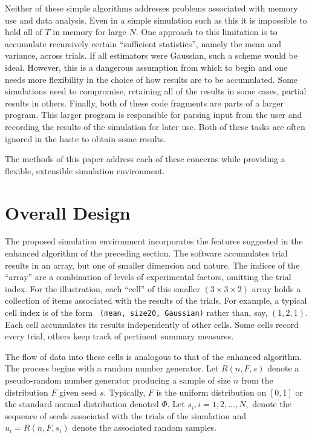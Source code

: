 Neither of these simple algorithms addresses problems associated with
memory use and data analysis.  Even in a simple simulation such as
this it is impossible to hold all of $T$ in memory for large $N$. One
approach to this limitation is to accumulate recursively certain
``sufficient statistics'', namely the mean and variance, across
trials. If all estimators were Gaussian, such a scheme would be
ideal.  However, this is a dangerous assumption from which to begin
and one needs more flexibility in the choice of how results are to be
accumulated. Some simulations need to compromise, retaining
all of the results in some cases, partial results in others. 
Finally, both of these code fragments are parts of a larger
program.  This larger program is responsible for parsing
input from the user and recording the results of the simulation
for later use.  Both of these tasks are often ignored in the haste to
obtain some results.

The methods of this paper address each of these concerns while
providing a flexible, extensible simulation environment.


\section{Overall Design}

The proposed simulation environment incorporates the features
suggested in the enhanced algorithm of the preceding section. The
software accumulates trial results in an array, but one of smaller
dimension and nature.  The indices of the ``array'' are a combination
of levels of experimental factors, omitting the trial index.  For the
illustration, each ``cell'' of this smaller $(3 \times 3 \times 2)$
array holds a collection of items associated with the results of the
trials.   For example, a typical cell index is of the form {\tt
(mean, size20, Gaussian)} rather than, say, $(1,2,1)$.  Each cell
accumulates its results independently of other cells.  Some cells
record every trial, others keep track of pertinent summary measures.


The flow of data into these cells is analogous to that of the enhanced
algorithm. The process begins with a random number generator.  Let
$R(n,F,s)$ denote a pseudo-random number generator producing a sample
of size $n$ from the distribution $F$ given seed $s$. 
Typically, $F$ is the uniform distribution on $[0,1]$ or the standard
normal distribution denoted $\Phi$.  Let $s_i, i =1,2,\ldots,N,$
denote the sequence of seeds associated with the trials of the
simulation and $u_i = R(n,F,s_i)$ denote the associated random
samples.


